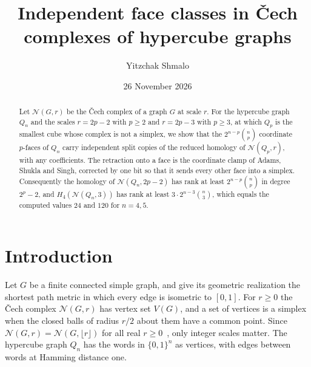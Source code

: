 \documentclass[11pt]{amsart}
\theoremstyle{remark}
\newcommand{\N}{\mathcal{N}}
\begin{document}
\title[Independent face classes for \v{C}ech complexes]{Independent face classes in \v{C}ech complexes of hypercube
graphs}
\author{Yitzchak Shmalo}
\date{26 November 2026}
\address{Einstein Institute of Mathematics, The Hebrew University of Jerusalem, Jerusalem, Israel}

\begin{abstract}
Let $\N(G,r)$ be the \v{C}ech complex of a graph $G$ at scale $r$. For the hypercube graph $Q_n$ and the scales
$r=2p-2$ with $p\ge2$ and $r=2p-3$ with $p\ge3$, at which $Q_p$ is the smallest cube whose complex is not a simplex, we
show that the $2^{n-p}\binom np$ coordinate $p$-faces of $Q_n$ carry independent split copies of the reduced homology of
$\N(Q_p,r)$, with any coefficients. The retraction onto a face is the coordinate clamp of Adams, Shukla and Singh,
corrected by one bit so that it sends every other face into a simplex. Consequently the homology of $\N(Q_n,2p-2)$ has rank at
least $2^{n-p}\binom np$ in degree $2^p-2$, and $H_4(\N(Q_n,3))$ has rank at least $3\cdot2^{n-3}\binom n3$, which equals the
computed values $24$ and $120$ for $n=4,5$.
\end{abstract}

\maketitle

\section{Introduction}

Let $G$ be a finite connected simple graph, and give its geometric realization the shortest path metric in which every
edge is isometric to $[0,1]$. For $r\ge0$ the \v{C}ech complex $\N(G,r)$ has vertex set $V(G)$, and a set of vertices is
a simplex when the closed balls of radius $r/2$ about them have a common point. Since $\N(G,r)=\N(G,\lfloor r\rfloor)$
for all real $r\ge0$~\cite[Section~2]{ASS}, only integer scales matter. The hypercube graph $Q_n$ has the words in
$\{0,1\}^n$ as vertices, with edges between words at Hamming distance one.
\end{document}
